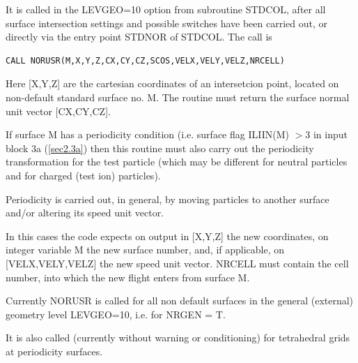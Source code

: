 It is called in the LEVGEO=10 option from subroutine
STDCOL,  after all surface intersection settings and possible switches have been carried out,
or directly via the entry point STDNOR of STDCOL. The call is
\begin{verbatim}
CALL NORUSR(M,X,Y,Z,CX,CY,CZ,SCOS,VELX,VELY,VELZ,NRCELL)
\end{verbatim}


Here [X,Y,Z] are the cartesian coordinates
of an intersetcion point, located on non-default standard surface no. M. The routine must return
the surface normal unit vector [CX,CY,CZ].

If surface M has a periodicity condition (i.e. surface flag ILIIN(M) $>$3 in input block 3a (\ref{sec2.3a})
then this routine must also carry out the periodicity transformation for the test particle (which may be different
for neutral particles and for charged (test ion) particles).

Periodicity is carried out, in general, by moving particles to another surface and/or altering its speed unit vector.

In this cases the code expects on output in [X,Y,Z] the new coordinates, on integer variable M the new surface number, and, if applicable,
on [VELX,VELY,VELZ] the new speed unit vector. NRCELL must contain the cell number, into which the new flight enters from surface M.

Currently NORUSR is called for all non default surfaces in the general (external) geometry level LEVGEO=10, i.e. for NRGEN = T.

It is also called (currently without warning or conditioning) for tetrahedral grids at periodicity surfaces.


